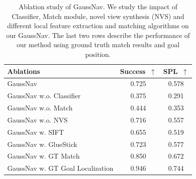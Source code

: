 \begin{table}[tb]
  \centering
  \small
  \begin{tabular}{@{}l c c@{}}
    \toprule
    Ablations & Success~$\uparrow$ & SPL~$\uparrow$ \\
    \midrule
    GaussNav & 0.725 & 0.578  \\
    GaussNav w.o. Classifier & 0.375 & 0.291 \\
    GaussNav w.o. Match & 0.444 & 0.353 \\
    GaussNav w.o. NVS & 0.716 & 0.557 \\
    GaussNav w. SIFT & 0.655 & 0.519 \\
    GaussNav w. GlueStick \cite{pautrat_suarez_2023_gluestick} & 0.723 & 0.577 \\
    GaussNav w. GT Match & 0.850 & 0.672 \\ 
    GaussNav w. GT Goal Localization & 0.946 & 0.744 \\
    \bottomrule
  \end{tabular}
  \vspace{5pt}
  \caption{Ablation study of GaussNav. We study the impact of Classifier, Match module, novel view synthesis (NVS) and different local feature extraction and matching algorithms on our GaussNav. The last two rows describe the performance of our method using ground truth match results and goal position.}  
  \vspace{-14pt}
  \label{tab:ablations}
\end{table}